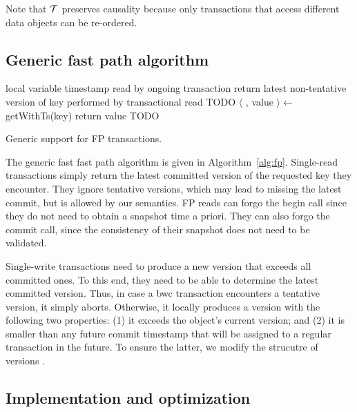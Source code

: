 Note that  ${\cal T}$  preserves causality because 
only transactions that  access different data objects can be re-ordered.


\subsection{Generic fast path algorithm}
\label{ssec:fast-algorithm}



\begin{algorithm}[htb]
\begin{algorithmic}
\State local variable  \Comment timestamp read by ongoing transaction
\Statex
{}
\State
return latest non-tentative version of key
\EndProcedure
\Statex
{} 
\Statex \Comment performed by transactional read
\EndProcedure
\Statex
{} 
\State  TODO
\EndProcedure
\Statex
{} 
\State $\langle$ , value  $\rangle \leftarrow$ getWithTs(key)
\State  return value
\EndProcedure
{} 
\State TODO
\EndProcedure

\end{algorithmic}
\caption{Generic support for FP transactions.}
\label{alg:fp}
\end{algorithm}

The generic fast fast path algorithm is given in Algorithm~\ref{alg:fp}. 
%
Single-read transactions simply return the latest committed version of the requested key they encounter.  
They ignore tentative versions, which may lead to missing the latest commit, but is allowed by our semantics. 
FP reads can forgo the begin call since they do not need to obtain a snapshot time a priori. 
They can also forgo the commit call, since the consistency of their snapshot does not need to be validated.
 
Single-write transactions need to produce a new version that exceeds all committed ones.  
To this end, they need to be able to determine the latest committed version. Thus, 
in case a bwc transaction encounters a tentative version, it simply aborts.
Otherwise, it locally produces a version with the following two properties:
(1) it exceeds the object's current version; and 
(2)  it is smaller than any future commit timestamp that will be assigned to a regular transaction in the future. 
To ensure the latter, we modify the strucutre of versions .














\subsection{Implementation and optimization}
\label{ssec:fast-impl}

